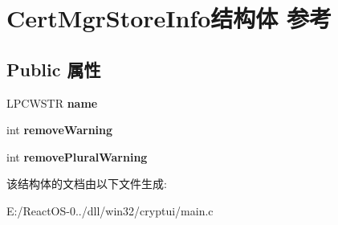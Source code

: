 \hypertarget{struct_cert_mgr_store_info}{}\section{Cert\+Mgr\+Store\+Info结构体 参考}
\label{struct_cert_mgr_store_info}
\subsection*{Public 属性}
\begin{DoxyCompactItemize}
\item 
\mbox{\label{struct_cert_mgr_store_info_ae9dcbfb8d795930e2c84648806efbfb0}} 
L\+P\+C\+W\+S\+TR {\bfseries name}
\item 
\mbox{\label{struct_cert_mgr_store_info_a874bf1b95ac7e5f6b8b026d2bdbf469f}} 
int {\bfseries remove\+Warning}
\item 
\mbox{\label{struct_cert_mgr_store_info_a77e6363a5d50427968ae13c0f6a78b0d}} 
int {\bfseries remove\+Plural\+Warning}
\end{DoxyCompactItemize}


该结构体的文档由以下文件生成\+:\begin{DoxyCompactItemize}
\item 
E\+:/\+React\+O\+S-\/0../dll/win32/cryptui/main.\+c\end{DoxyCompactItemize}
